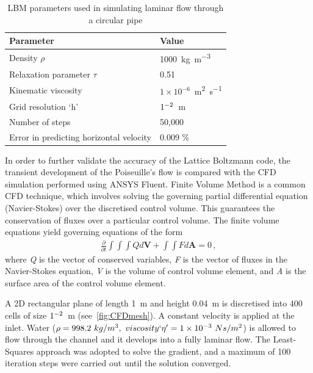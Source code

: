 \begin{table}[tb]
\caption{LBM parameters used in simulating laminar flow through 
a circular pipe}
\label{table:lbm}
\centering
\begin{tabular}{ll}
\toprule
\textbf{Parameter} & \textbf{Value} \\ \midrule
Density $\rho$ & 1000~\si{\kilogram\per\metre\cubed}\\ 
Relaxation parameter $\tau$ & 0.51\\ 
Kinematic viscosity  & $1 \times 10^{-6}$~\si{\metre\squared\per\second} \\
Grid resolution `h' & $1 \time 10^{-2} $~\si{\meter} \\
Number of steps & 50,000 \\
\midrule
Error in predicting horizontal velocity & 0.009 \% \\ \bottomrule
\end{tabular}
\end{table}

In order to further validate the accuracy of the Lattice Boltzmann code, the 
transient development of the Poiseuille's flow is compared with the CFD 
simulation performed using ANSYS Fluent. Finite Volume Method is a 
common CFD 
technique, which involves solving the governing partial differential 
equation 
(Navier-Stokes) over the discretised control volume. This guarantees 
the conservation of fluxes over a particular control volume. The finite volume 
equations yield governing equations of the form
%
\begin{align}
\frac{\partial}{\partial t} \int\int\int  Q d\mathbf{V} + 
\int\int \mathit{F} d\mathbf{A} = 0\,,
\end{align}
%
where \textit{Q} is the vector of conserved variables, 
\textit{F} is the vector of fluxes in the Navier-Stokes 
equation, \textit{V} is the volume of control volume element, 
and \textit{A} is the surface area of the control volume 
element.

A 2D rectangular plane of length 1~\si{\meter} and height 0.04~\si{\meter} 
is discretised into 400 cells of size $1 \time 10^{-2} $~\si{\meter} 
(see~\cref{fig:CFDmesh}). A constant velocity is applied at the 
inlet. Water ($\rho = 998.2\mbox{ }kg/m^{3},\mbox{ } 
viscosity`\eta'=1 \times 10^{-3}\mbox{ } Ns/m^{2} $) is allowed to flow through 
the channel and it develops into a fully laminar flow. The Least-Squares 
approach was adopted to solve the gradient, and a maximum of 100 
iteration steps were carried out until the solution converged. 

